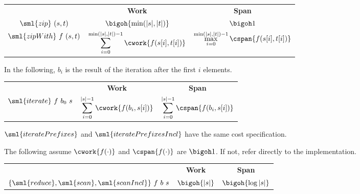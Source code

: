 \begin{cluster}
\label{grp:cst:array-seq::zip}

\begin{costspec}[Zip]
\label{cst:array-seq::zip}
\begin{tabular}{c|c|c}
& \textbf{Work} & \textbf{Span} \\
$\sml{zip}~(s,t)$ &
$\displaystyle \bigoh{\min(|s|,|t|)}$ &
$\displaystyle \bigoh 1$ \\
$\sml{zipWith}~f~(s,t)$ &
$\displaystyle \sum_{i = 0}^{\min(|s|,|t|)-1} \cwork{f(s[i],t[i])}$ &
$\displaystyle \max_{i = 0}^{\min(|s|,|t|)-1} \cspan{f(s[i],t[i])}$
\end{tabular}

\end{costspec}
\end{cluster}

\begin{flex}
\label{grp:grm:array-seq::iteration}

\begin{costspec}[Iteration]
\label{grm:array-seq::iteration}
In the following, $b_i$ is the result of the iteration after the first $i$
elements.
\begin{tabular}{c|c|c}
& \textbf{Work} & \textbf{Span} \\
$\sml{iterate}~f~b_0~s$ &
$\displaystyle \sum_{i = 0}^{|s|-1} \cwork{f(b_i, s[i])}$ &
$\displaystyle \sum_{i = 0}^{|s|-1} \cspan{f(b_i, s[i])}$
\end{tabular}

\end{costspec}

\begin{note}
\label{nt:array-seq::iterateprefixes}
$\sml{iteratePrefixes}$ and $\sml{iteratePrefixesIncl}$ have the same cost
specification.

\end{note}
\end{flex}

\begin{cluster}
\label{grp:cst:array-seq::parallel-aggregation}

\begin{costspec}
\label{cst:array-seq::parallel-aggregation}
The following assume $\cwork{f(\cdot)}$ and $\cspan{f(\cdot)}$ are $\bigoh 1$. If not,
refer directly to the implementation.
\begin{tabular}{c|c|c}
& \textbf{Work} & \textbf{Span} \\
$\{\sml{reduce},\sml{scan},\sml{scanIncl}\}~f~b~s$ &
$\displaystyle \bigoh{|s|}$ &
$\displaystyle \bigoh{\log{|s|}}$
\end{tabular}

\end{costspec}
\end{cluster}

